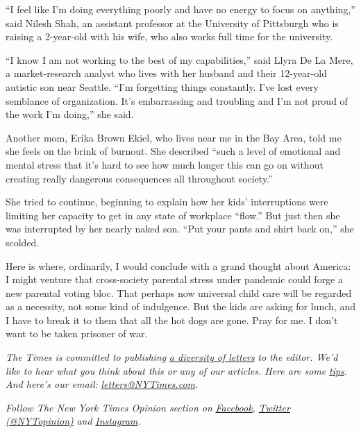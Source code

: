 ``I feel like I'm doing everything poorly and have no energy to focus on
anything,'' said Nilesh Shah, an assistant professor at the University
of Pittsburgh who is raising a 2-year-old with his wife, who also works
full time for the university.

``I know I am not working to the best of my capabilities,'' said Llyra
De La Mere, a market-research analyst who lives with her husband and
their 12-year-old autistic son near Seattle. ``I'm forgetting things
constantly. I've lost every semblance of organization. It's embarrassing
and troubling and I'm not proud of the work I'm doing,'' she said.

Another mom, Erika Brown Ekiel, who lives near me in the Bay Area, told
me she feels on the brink of burnout. She described ``such a level of
emotional and mental stress that it's hard to see how much longer this
can go on without creating really dangerous consequences all throughout
society.''

She tried to continue, beginning to explain how her kids' interruptions
were limiting her capacity to get in any state of workplace ``flow.''
But just then she was interrupted by her nearly naked son. ``Put your
pants and shirt back on,'' she scolded.

Here is where, ordinarily, I would conclude with a grand thought about
America: I might venture that cross-society parental stress under
pandemic could forge a new parental voting bloc. That perhaps now
universal child care will be regarded as a necessity, not some kind of
indulgence. But the kids are asking for lunch, and I have to break it to
them that all the hot dogs are gone. Pray for me. I don't want to be
taken prisoner of war.

\emph{The Times is committed to publishing}
\href{https://www.nytimes3xbfgragh.onion/2019/01/31/opinion/letters/letters-to-editor-new-york-times-women.html}{\emph{a
diversity of letters}} \emph{to the editor. We'd like to hear what you
think about this or any of our articles. Here are some}
\href{https://help.nytimes3xbfgragh.onion/hc/en-us/articles/115014925288-How-to-submit-a-letter-to-the-editor}{\emph{tips}}\emph{.
And here's our email:}
\href{mailto:letters@NYTimes.com}{\emph{letters@NYTimes.com}}\emph{.}

\emph{Follow The New York Times Opinion section on}
\href{https://www.facebookcorewwwi.onion/nytopinion}{\emph{Facebook}}\emph{,}
\href{http://twitter.com/NYTOpinion}{\emph{Twitter (@NYTopinion)}}
\emph{and}
\href{https://www.instagram.com/nytopinion/}{\emph{Instagram}}\emph{.}

